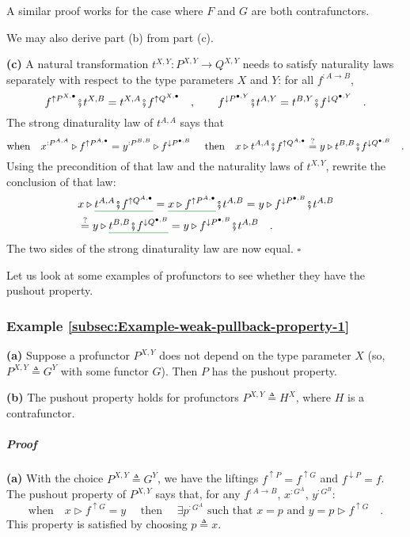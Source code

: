 A similar proof works for the case where $F$ and $G$ are both contrafunctors.

We may also derive part (b) from part (c).

\textbf{(c)} A natural transformation $t^{X,Y}:P^{X,Y}\rightarrow Q^{X,Y}$
needs to satisfy naturality laws separately with respect to the type
parameters $X$ and $Y$: for all $f^{:A\rightarrow B}$,
\[
f^{\uparrow P^{X,\bullet}}\bef t^{X,B}=t^{X,A}\bef f^{\uparrow Q^{X,\bullet}}\quad,\quad\quad f^{\downarrow P^{\bullet,Y}}\bef t^{A,Y}=t^{B,Y}\bef f^{\downarrow Q^{\bullet,Y}}\quad.
\]
The strong dinaturality law of $t^{A,A}$ says that
\[
\text{when}\quad x^{:P^{A,A}}\triangleright f^{\uparrow P^{A,\bullet}}=y^{:P^{B,B}}\triangleright f^{\downarrow P^{\bullet,B}}\quad\text{ then}\quad x\triangleright t^{A,A}\bef f^{\uparrow Q^{A,\bullet}}\overset{?}{=}y\triangleright t^{B,B}\bef f^{\downarrow Q^{\bullet,B}}\quad.
\]
Using the precondition of that law and the naturality laws of $t^{X,Y}$,
rewrite the conclusion of that law:
\begin{align*}
 & x\triangleright\gunderline{t^{A,A}\bef f^{\uparrow Q^{A,\bullet}}}=\gunderline{x\triangleright f^{\uparrow P^{A,\bullet}}}\bef t^{A,B}=y\triangleright f^{\downarrow P^{\bullet,B}}\bef t^{A,B}\\
 & \overset{?}{=}y\triangleright\gunderline{t^{B,B}\bef f^{\downarrow Q^{\bullet,B}}}=y\triangleright f^{\downarrow P^{\bullet,B}}\bef t^{A,B}\quad.
\end{align*}
The two sides of the strong dinaturality law are now equal. $\square$

Let us look at some examples of profunctors to see whether they
have the pushout property.

\subsubsection{Example \label{subsec:Example-weak-pullback-property-1}\ref{subsec:Example-weak-pullback-property-1}}

\textbf{(a)} Suppose a profunctor $P^{X,Y}$ does not depend on the
type parameter $X$ (so, $P^{X,Y}\triangleq G^{Y}$ with some functor
$G$). Then $P$ has the pushout property. 

\textbf{(b)} The pushout property holds for profunctors $P^{X,Y}\triangleq H^{X}$,
where $H$ is a contrafunctor.

\subparagraph{Proof}

\textbf{(a)} With the choice $P^{X,Y}\triangleq G^{Y}$, we have the
liftings $f^{\uparrow P}=f^{\uparrow G}$ and $f^{\downarrow P}=f$.
The pushout property of $P^{X,Y}$ says that, for any $f^{:A\rightarrow B}$,
$x^{:G^{A}}$, $y^{:G^{B}}$:
\[
\text{when}\quad x\triangleright f^{\uparrow G}=y\quad\text{ then }\quad\exists p^{:G^{A}}\text{ such that }x=p\text{ and }y=p\triangleright f^{\uparrow G}\quad.
\]
This property is satisfied by choosing $p\triangleq x$.

